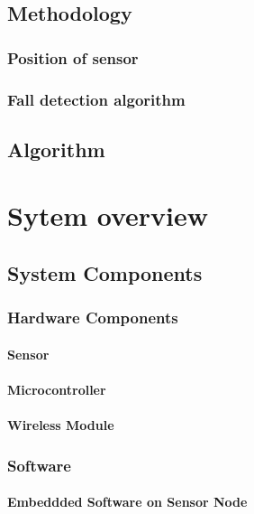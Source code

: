 \documentclass[letterpaper,12pt,titlepage,oneside,final]{book}
\begin{document}
\section{Methodology}

\subsection{Position of sensor}

\subsection{Fall detection algorithm}

\section{Algorithm}

\chapter{Sytem overview}

\section{System Components}

\subsection{Hardware Components}

\subsubsection{Sensor}

\subsubsection{Microcontroller}

\subsubsection{Wireless Module}

\subsection{Software}

\subsubsection{Embeddded Software on Sensor Node}
\end{document}
